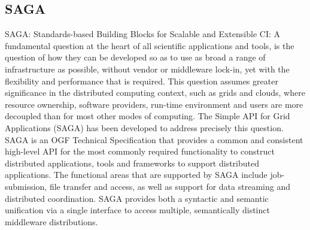 \documentclass[]{svjour3}
\begin{document}



\subsection{SAGA}



SAGA: Standards-based Building Blocks for Scalable and Extensible CI:
A fundamental question at the heart of all scientific applications and
tools, is the question of how they can be developed so as to use as
broad a range of infrastructure as possible, without vendor or
middleware lock-in, yet with the flexibility and performance that is
required. This question assumes greater significance in the distributed
computing context, such as grids and clouds, where resource ownership,
software providers, run-time environment and users are more decoupled
than for most other modes of computing. The Simple API for Grid
Applications (SAGA) has been developed to address precisely this
question. SAGA\cite{saga_url} is an OGF Technical Specification that
provides a common and consistent high-level API for the most commonly
required functionality to construct distributed applications, tools
and frameworks to support distributed applications. The functional
areas that are supported by SAGA include job-submission, file transfer
and access, as well as support for data streaming and distributed
coordination. SAGA provides both a syntactic and semantic unification
via a single interface to access multiple, semantically distinct
middleware distributions.
\end{document}
